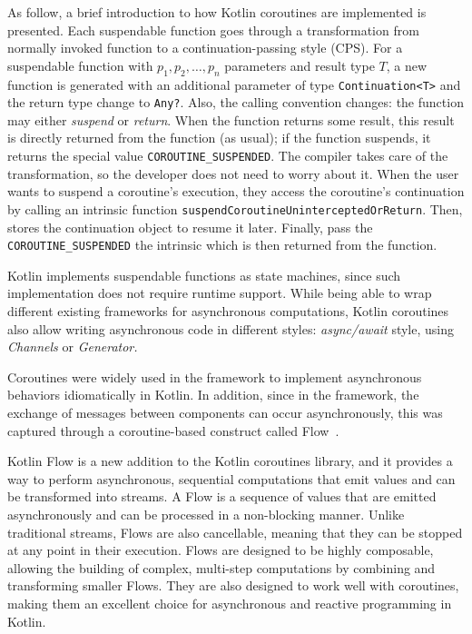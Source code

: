 As follow, a brief introduction to how Kotlin coroutines are implemented is presented.
Each suspendable function goes through a transformation from normally invoked function to a continuation-passing style (CPS).
For a suspendable function with $p_1, p_2, \dots, p_n$ parameters and result type $T$, a new function is generated with an additional parameter of
type \texttt{Continuation<T>} and the return type change to \texttt{Any?}.
Also, the calling convention changes: the function may either \emph{suspend} or \emph{return}. When the function returns some result, this result is
directly returned from the function (as usual); if the function suspends, it returns the special value \texttt{COROUTINE\_SUSPENDED}.
The compiler takes care of the transformation, so the developer does not need to worry about it. When the user wants to suspend a coroutine's
execution, they access the coroutine's continuation by calling an intrinsic function \texttt{suspendCoroutineUninterceptedOrReturn}. Then, stores the
continuation object to resume it later. Finally, pass the \texttt{COROUTINE\_SUSPENDED} the intrinsic which is then returned from the function.

Kotlin implements suspendable functions as state machines, since such implementation does not require runtime support.
While being able to wrap different existing frameworks for asynchronous computations, Kotlin coroutines also allow writing asynchronous code in
different styles: \emph{async/await} style, using \emph{Channels} or \emph{Generator.}

Coroutines were widely used in the framework to implement asynchronous behaviors idiomatically in Kotlin. In addition, since in the framework, the
exchange of messages between components can occur asynchronously, this was captured through a coroutine-based construct called Flow~\cite{flow}.

Kotlin Flow is a new addition to the Kotlin coroutines library, and it provides a way to perform asynchronous, sequential computations that emit
values and can be transformed into streams. A Flow is a sequence of values that are emitted asynchronously and can be processed in a non-blocking
manner. Unlike traditional streams, Flows are also cancellable, meaning that they can be stopped at any point in their execution. Flows are designed
to be highly composable, allowing the building of complex, multi-step computations by combining and transforming smaller Flows. They are also
designed to work well with coroutines, making them an excellent choice for asynchronous and reactive programming in Kotlin.

